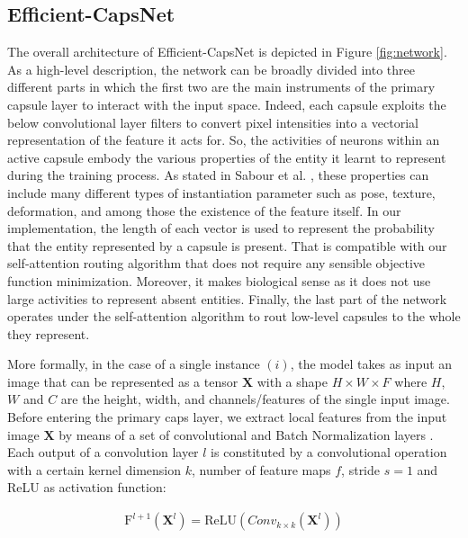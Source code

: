 \documentclass{article}
\begin{document}
\subsection{Efficient-CapsNet}
The overall architecture of Efficient-CapsNet is depicted in Figure \ref{fig:network}. As a high-level description, the network can be broadly divided into three different parts in which the first two are the main instruments of the primary capsule layer to interact with the input space. Indeed, each capsule exploits the below convolutional layer filters to convert pixel intensities into a vectorial representation of the feature it acts for. So, the activities of neurons within an active capsule embody the various properties of the entity it learnt to represent during the training process. As stated in Sabour et al. \cite{sabour2017dynamic}, these properties can include many different types of instantiation parameter such as pose, texture, deformation, and among those the existence of the feature itself. In our implementation, the length of each vector is used to represent the probability that the entity represented by a capsule is present. That is compatible with our self-attention routing algorithm that does not require any sensible objective function minimization. Moreover, it makes biological sense as it does not use large activities to represent absent entities. Finally, the last part of the network operates under the self-attention algorithm to rout low-level capsules to the whole they represent. 

More formally, in the case of a single instance $(i)$, the model takes as input an image that can be represented as a tensor $\textbf{X}$ with a shape $H \times W \times F$ where $H$, $W$ and $C$ are the height, width, and channels/features of the single input image. Before entering the primary caps layer, we extract local features from the input image $\textbf{X}$ by means of a set of convolutional and Batch Normalization layers \cite{ioffe2015batch}. Each output of a convolution layer $l$ is constituted by a convolutional operation with a certain kernel dimension $k$, number of feature maps $f$, stride $s=1$ and ReLU as activation function:
\begin{ceqn}
\begin{gather}
    \mathrm{F}^{l+1}(\textbf{X}^{l}) = \mathrm{ReLU}\left(Conv_{k \times k}(\textbf{X}^{l})\right)
\end{gather}
\end{ceqn}
\end{document}

